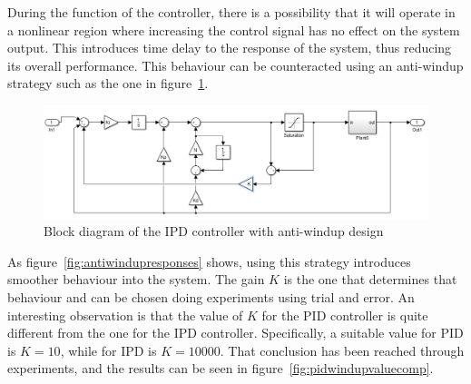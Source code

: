 During the function of the controller, there is a possibility that it will operate in a nonlinear region where increasing the control signal has no effect on the system output. This introduces time delay to the response of the system, thus reducing its overall performance. This behaviour can be counteracted using an anti-windup strategy such as the one in figure~\ref{fig:ipdantiwindupstrategy}.

\begin{figure}[!h]
	\centering
	\includegraphics[width=1\linewidth]{graphics/ipdwindupdesign}
	\caption{Block diagram of the IPD controller with anti-windup design}
	\label{fig:ipdantiwindupstrategy}
\end{figure}

As figure~\ref{fig:antiwindupresponses} shows, using this strategy introduces smoother behaviour into the system. The gain $K$ is the one that determines that behaviour and can be chosen doing experiments using trial and error. An interesting observation is that the value of $K$ for the PID controller is quite different from the one for the IPD controller. Specifically, a suitable value for PID is $K=10$, while for IPD is $K=10000$. That conclusion has been reached through experiments, and the results can be seen in figure~\ref{fig:pidwindupvaluecomp}.


